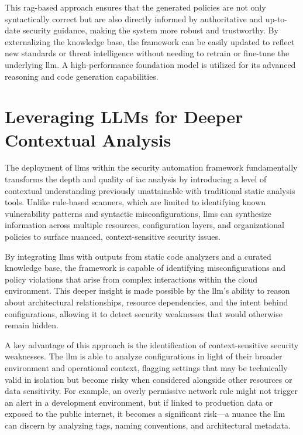 This \gls{rag}-based approach ensures that the generated policies are not only syntactically correct but are also directly informed by authoritative and up-to-date security guidance, making the system more robust and trustworthy. By externalizing the knowledge base, the framework can be easily updated to reflect new standards or threat intelligence without needing to retrain or fine-tune the underlying \gls{llm}. A high-performance foundation model is utilized for its advanced reasoning and code generation capabilities.


\section{Leveraging LLMs for Deeper Contextual Analysis} %
\label{sec:Leveraging LLMs for Deeper Contextual Analysis}


The deployment of \glspl{llm} within the security automation framework fundamentally transforms the depth and quality of \gls{iac} analysis by introducing a level of contextual understanding previously unattainable with traditional static analysis tools\cite{li_iris_2025,andrade_enhancing_2025-1}. Unlike rule-based scanners, which are limited to identifying known vulnerability patterns and syntactic misconfigurations, \glspl{llm} can synthesize information across multiple resources, configuration layers, and organizational policies to surface nuanced, context-sensitive security issues\cite{li_iris_2025}.

By integrating \glspl{llm} with outputs from static code analyzers and a curated knowledge base, the framework is capable of identifying misconfigurations and policy violations that arise from complex interactions within the cloud environment\cite{andrade_enhancing_2025-1}. This deeper insight is made possible by the \gls{llm}'s ability to reason about architectural relationships, resource dependencies, and the intent behind configurations, allowing it to detect security weaknesses that would otherwise remain hidden\cite{li_iris_2025,andrade_enhancing_2025-1}.

A key advantage of this approach is the identification of context-sensitive security weaknesses. The \gls{llm} is able to analyze configurations in light of their broader environment and operational context, flagging settings that may be technically valid in isolation but become risky when considered alongside other resources or data sensitivity. For example, an overly permissive network rule might not trigger an alert in a development environment, but if linked to production data or exposed to the public internet, it becomes a significant risk—a nuance the \gls{llm} can discern by analyzing tags, naming conventions, and architectural metadata\cite{andrade_enhancing_2025-1}.

